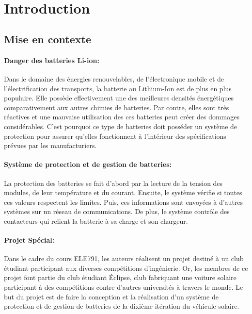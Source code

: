 \section{Introduction}

	\subsection{Mise en contexte}
		\paragraph*{Danger des batteries Li-ion:}
		Dans le domaine des énergies renouvelables, de l'électronique mobile et de l'électrification des transports, la batterie au Lithium-Ion est de plus en plus populaire. Elle possède effectivement une des meilleures densités énergétiques comparativement aux autres chimies de batteries. Par contre, elles sont très réactives et une mauvaise utilisation des ces batteries peut créer des dommages considérables. C'est pourquoi ce type de batteries doit posséder un système de protection pour assurer qu'elles fonctionnent à l'intérieur des spécifications prévues par les manufacturiers.
		
		\paragraph*{Système de protection et de gestion de batteries:}
		La protection des batteries se fait d'abord par la lecture de la tension des modules, de leur température et du courant. Ensuite, le système vérifie si toutes ces valeurs respectent les limites. Puis, ces informations sont envoyées à d'autres systèmes sur un réseau de communications. De plus, le système contrôle des contacteurs qui relient la batterie à sa charge et son chargeur.
		
		\paragraph*{Projet Spécial:}		
		Dans le cadre du cours ELE791, les auteurs réalisent un projet destiné à un club étudiant participant aux diverses compétitions d'ingénierie. Or, les membres de ce projet font partie du club étudiant Éclipse, club fabriquant une voiture solaire participant à des compétitions contre d'autres universités à travers le monde. Le but du projet est de faire la conception et la réalisation d'un système de protection et de gestion de batteries de la dixième itération du véhicule solaire. 
		
